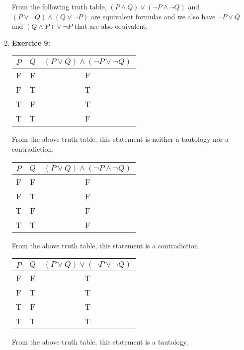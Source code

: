 \documentclass{article} %
\begin{document}
\begin{enumerate}
    From the following truth table, $(P \land Q) \lor (\neg P \land \neg Q)$ and $(P \lor \neg Q) \land (Q \lor \neg P)$ are equivalent formulas and we also have $\neg P \lor Q$ and $(Q \land P) \lor \neg P$ that are also equivalent.

    \item \textbf{Exercice 9:}
    \begin{center}
    \begin{tabular}{ccc}
        $P$ & $Q$ & $(P \lor Q) \land (\neg P \lor \neg Q)$ \\
        \hline
        F & F & F \\
        F & T & T \\
        T & F & T \\
        T & T & F \\
    \end{tabular}
    \end{center}

    From the above truth table, this statement is neither a tautology nor a contradiction.

    \begin{center}
    \begin{tabular}{ccc}
        $P$ & $Q$ & $(P \lor Q) \land (\neg P \land \neg Q)$ \\
        \hline
        F & F & F \\
        F & T & F \\
        T & F & F \\
        T & T & F \\
    \end{tabular}
    \end{center}

    From the above truth table, this statement is a contradiction.

    \begin{center}
    \begin{tabular}{ccc}
        $P$ & $Q$ & $(P \lor Q) \lor (\neg P \lor \neg Q)$ \\
        \hline
        F & F & T \\
        F & T & T \\
        T & F & T \\
        T & T & T \\
    \end{tabular}
    \end{center}

    From the above truth table, this statement is a tautology.


\end{enumerate}
\end{document}

